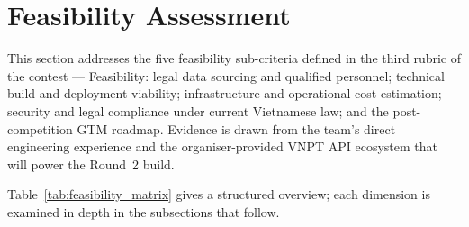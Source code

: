 %
%

\section{Feasibility Assessment}
\label{sec:feasibility}

This section addresses the five feasibility sub-criteria defined in the third rubric of the contest --- Feasibility:
legal data sourcing and qualified personnel; technical build and deployment
viability; infrastructure and operational cost estimation; security and legal
compliance under current Vietnamese law; and the post-competition GTM
roadmap. Evidence is drawn from the team's direct engineering experience and
the organiser-provided VNPT API ecosystem that will power the Round~2 build.

Table~\ref{tab:feasibility_matrix} gives a structured overview; each dimension
is examined in depth in the subsections that follow.

